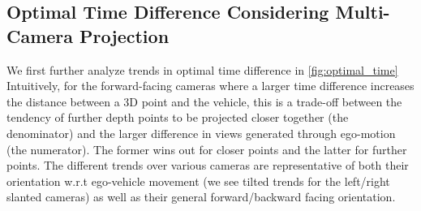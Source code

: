\documentclass[runningheads, hyperfootnotes=false]{article}
\begin{document}
\subsection{Optimal Time Difference Considering Multi-Camera Projection}\label{app:theory_optimal_time_cam}
We first further analyze trends in optimal time difference in \ref{fig:optimal_time}
Intuitively, for the forward-facing cameras where a larger time difference increases the distance between a 3D point and the vehicle, this is a trade-off between the tendency of further depth points to be projected closer together (the denominator) and the larger difference in views generated through ego-motion (the numerator). The former wins out for closer points and the latter for further points. The different trends over various cameras are representative of both their orientation w.r.t ego-vehicle movement (we see tilted trends for the left/right slanted cameras) as well as their general forward/backward facing orientation.
\end{document}
